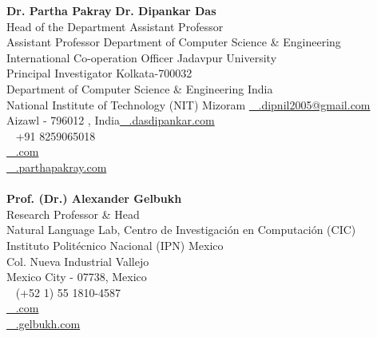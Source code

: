 \textbf{Dr. Partha Pakray} \hfill \textbf{Dr. Dipankar Das}\\
Head of the Department \hfill Assistant Professor\\
Assistant Professor \hfill Department of Computer Science \& Engineering\\
International Co-operation Officer \hfill Jadavpur University\\
Principal Investigator \hfill Kolkata-700032\\
Department of Computer Science & Engineering \hfill India\\
National Institute of Technology (NIT) Mizoram \hfill \href{mailto:\@email}{\faEnvelope\ \hspace{2mm} \@dipankar.dipnil2005@gmail.com\\}
Aizawl - 796012 , India\hfill \href{http://\@homepage}{\faHome\ \hspace{2mm} \@www.dasdipankar.com\\}
\faMobile\ \hspace{1mm} \@+91 8259065018 \\
\href{mailto:\@email}{\faEnvelope\ \hspace{2mm} \@parthapakray@gmail.com\\}
\href{http://\@homepage}{\faHome\ \hspace{2mm} \@www.parthapakray.com\\}\\
\textbf{Prof. (Dr.) Alexander Gelbukh}\\
Research Professor \& Head\\
Natural Language Lab,
Centro de Investigación en Computación (CIC)\\ Instituto Politécnico Nacional (IPN) Mexico\\
Col. Nueva Industrial Vallejo\\
Mexico City - 07738, Mexico\\
\faMobile\ \hspace{1mm} \@(+52 1) 55 1810-4587\\
\href{mailto:\@email}{\faEnvelope\ \hspace{1mm} \@gelbukh@gelbukh.com\\}
\href{http://\@homepage}{\faHome\ \hspace{2mm} \@www.gelbukh.com}